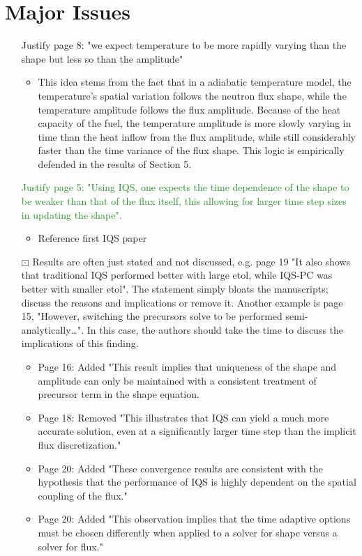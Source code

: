 \documentclass{elsarticle}
\newcommand{\working}{$\boxdot$}
\newcommand{\done}{\checkmark}
\newcommand{\easy}[1]{\textcolor{ForestGreen}{#1}}
\newcommand{\medm}[1]{\textcolor{BurntOrange}{#1}}
\begin{document}
\section*{Major Issues}

\begin{itemize}

\item[\done] \medm{ Justify page 8: "we expect temperature to be more rapidly varying than the shape but less so than the amplitude" }
\begin{itemize}
\item This idea stems from the fact that in a adiabatic temperature model, the temperature's spatial variation follows the neutron flux shape, while the temperature amplitude follows the flux amplitude. Because of the heat capacity of the fuel, the temperature amplitude is more slowly varying in time than the heat inflow from the flux amplitude, while still considerably faster than the time variance of the flux shape. This logic is empirically defended in the results of Section 5.
\end{itemize}

\item[\done] \easy{ Justify page 5: "Using IQS, one expects the time dependence of the shape to be weaker than that of the flux itself, this allowing for larger time step sizes in updating the shape". }
\begin{itemize}
\item Reference first IQS paper
\end{itemize}

\item[\working] \medm{  Results are often just stated and not discussed, e.g. page 19 "It also shows that traditional IQS performed better with large etol, while IQS-PC was better with smaller etol". The statement simply bloats the manuscripts; discuss the reasons and implications or remove it. Another example is page 15, "However, switching the precursors solve to be performed semi-analytically…".  In this case, the authors should take the time to discuss the implications of this finding. }
\begin{itemize}
\item Page 16: Added "This result implies that uniqueness of the shape and amplitude can only be maintained with a consistent treatment of precursor term in the shape equation.
\item Page 18: Removed "This illustrates that IQS can yield a much more accurate solution, even at a significantly larger time step than the implicit flux discretization."
\item Page 20: Added "These convergence results are consistent with the hypothesis that the performance of IQS is highly dependent on the spatial coupling of the flux."
\item Page 20: Added "This observation implies that the time adaptive options must be chosen differently when applied to a solver for shape versus a solver for flux."
\end{itemize}


\end{itemize}
\end{document}
